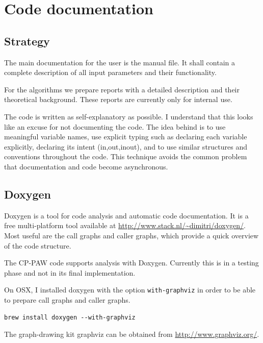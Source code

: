 \documentclass[final,12pt,makeidx,DIV=calc]{article}
\begin{document}
{{{{{{\section{Code documentation}
\subsection{Strategy}
The main documentation for the user is the manual file. It shall
contain a complete description of all input parameters and their
functionality.

For the algorithms we prepare reports with a detailed description and
their theoretical background. These reports are currently only for
internal use. 

The code is written as self-explanatory as possible. I understand that
this looks like an excuse for not documenting the code. The idea
behind is to use meaningful variable names, use explicit typing such
as declaring each variable explicitly, declaring its intent
(in,out,inout), and to use similar structures and conventions
throughout the code. This technique avoids the common problem that
documentation and code become asynchronous.

\subsection{Doxygen}
Doxygen is a tool for code analysis and automatic code
documentation. It is a free multi-platform tool available at
\url{http://www.stack.nl/~dimitri/doxygen/}. Most useful are the call
graphs and caller graphs, which provide a quick overview of the code
structure.

The CP-PAW code supports analysis with Doxygen. Currently this is in a
testing phase and not in its final implementation. 

On OSX, I installed doxygen with the option \verb|with-graphviz| in
order to be able to prepare call graphs and caller graphs. 
\begin{verbatim} 
brew install doxygen --with-graphviz
\end{verbatim}
The graph-drawing kit graphviz can be obtained from
\url{http://www.graphviz.org/}.

}}}}}}
\end{document}
